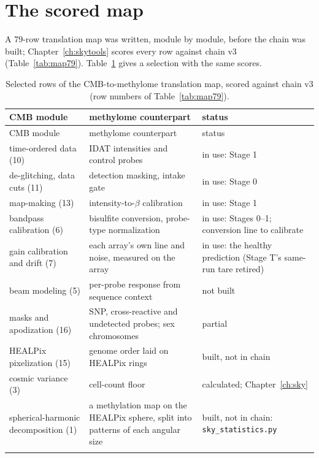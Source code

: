 \section{The scored map}

A 79-row translation map was written, module by module, before the chain was built; Chapter~\ref{ch:skytools} scores
every row against chain v3 (Table~\ref{tab:map79}). Table~\ref{tab:cmbmap} gives a selection with the same scores.

\begin{center}\small
\begin{longtable}{@{}p{}p{}p{}@{}}
\caption{Selected rows of the CMB-to-methylome translation map, scored against chain v3 (row numbers of
Table~\ref{tab:map79}).}\label{tab:cmbmap}\\
\toprule CMB module & methylome counterpart & status \\\midrule\endfirsthead
\toprule CMB module & methylome counterpart & status \\\midrule\endhead
time-ordered data (10) & IDAT intensities and control probes & in use: Stage 1 \\ \rowrule
de-glitching, data cuts (11) & detection masking, intake gate & in use: Stage 0 \\ \rowrule
map-making (13) & intensity-to-$\beta$ calibration & in use: Stage 1 \\ \rowrule
bandpass calibration (6) & bisulfite conversion, probe-type normalization & in use: Stages 0--1; conversion line to calibrate \\ \rowrule
gain calibration and drift (7) & each array's own line and noise, measured on the array & in use: the healthy prediction (Stage T's same-run tare retired) \\ \rowrule
beam modeling (5) & per-probe response from sequence context & not built \\ \rowrule
masks and apodization (16) & SNP, cross-reactive and undetected probes; sex chromosomes & partial \\ \rowrule
HEALPix pixelization (15) & genome order laid on HEALPix rings & built, not in chain \\ \rowrule
cosmic variance (3) & cell-count floor & calculated; Chapter~\ref{ch:sky} \\ \rowrule
spherical-harmonic decomposition (1) & a methylation map on the HEALPix sphere, split into patterns of each angular size & built, not in chain: \texttt{sky\_statistics.py} \\ \rowrule

\end{longtable}
\end{center}
